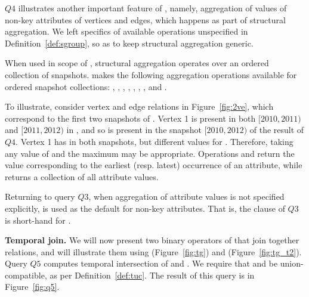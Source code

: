 $Q4$ illustrates another important feature of \ql, namely, aggregation
of values of non-key attributes of vertices and edges, which happens
as part of structural aggregation.  We left specifics of available
operations unspecified in Definition~\ref{def:sgroup}, so as to keep
structural aggregation generic.  

When used in scope of , structural aggregation operates
over an ordered collection of snapshots.  \ql makes the following
aggregation operations available for ordered snapshot collections:
, , , , ,
, , and .

To illustrate, consider vertex and edge relations in
Figure~\ref{fig:2ve}, which correspond to the first two snapshots of
.  Vertex 1 is present in both $[2010, 2011)$ and $[2011,
    2012)$ in , and so is present in the snapshot $[2010,
      2012)$ of the result of $Q4$.  Vertex 1 has 
      in both snapshots, but different values for .
      Therefore, taking any value of  and the maximum
       may be appropriate.  Operations  and
       return the value corresponding to the earliest
      (resp. latest) occurrence of an attribute, while 
      returns a collection of all attribute values.

Returning to query $Q3$, when aggregation of attribute values is not
specified explicitly,  is used as the default for non-key
attributes.  That is, the  clause of $Q3$ is short-hand
for  
.


{\bf Temporal join.} We will now present two binary operators of \ql
that join together \tg relations, and will illustrate them using
 (Figure~\ref{fig:tg}) and 
(Figure~\ref{fig:tg_t2}).  Query $Q5$ computes temporal intersection
of  and .  We require that  and
 be union-compatible, as per Definition~\ref{def:tuc}.  The
result of this query is in Figure~\ref{fig:q5}.

